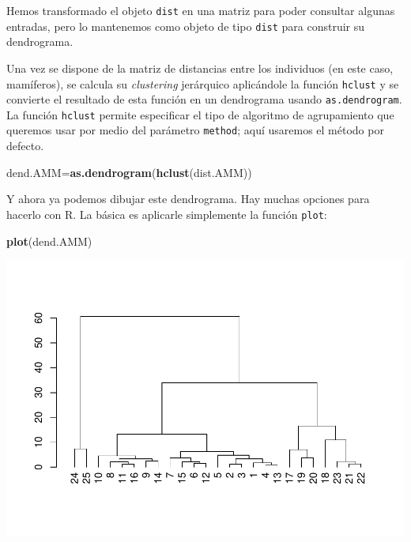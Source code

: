 \documentclass[
]{book}
\newenvironment{Shaded}{\begin{snugshade}}{\end{snugshade}}
\newcommand{\KeywordTok}[1]{\textcolor[rgb]{0.13,0.29,0.53}{\textbf{#1}}}
\newcommand{\NormalTok}[1]{#1}
\theoremstyle{definition}
\theoremstyle{definition}
\theoremstyle{definition}
\theoremstyle{remark}
\begin{document}
Hemos transformado el objeto \texttt{dist} en una matriz para poder consultar algunas entradas, pero lo mantenemos como objeto de tipo \texttt{dist} para construir su dendrograma.

Una vez se dispone de la matriz de distancias entre los individuos (en este caso, mamíferos), se calcula su \emph{clustering} jerárquico aplicándole la función \texttt{hclust} y se convierte el resultado de esta función en un dendrograma usando \texttt{as.dendrogram}.
La función \texttt{hclust} permite especificar el tipo de algoritmo de agrupamiento que queremos usar por medio del parámetro \texttt{method}; aquí usaremos el método por defecto.

\begin{Shaded}
\begin{Highlighting}[]
\NormalTok{dend.AMM=}\KeywordTok{as.dendrogram}\NormalTok{(}\KeywordTok{hclust}\NormalTok{(dist.AMM))}
\end{Highlighting}
\end{Shaded}

Y ahora ya podemos dibujar este dendrograma. Hay muchas opciones para hacerlo con R. La básica es aplicarle simplemente la función \texttt{plot}:

\begin{Shaded}
\begin{Highlighting}[]
\KeywordTok{plot}\NormalTok{(dend.AMM)}
\end{Highlighting}
\end{Shaded}

\begin{center}\includegraphics[width=0.9\linewidth]{14cap13_EDextra_files/figure-latex/unnamed-chunk-21-1} \end{center}
\end{document}
